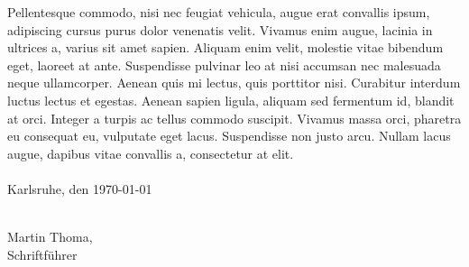 \documentclass[11pt,a4paper,oneside]{scrartcl}
\newcommand\Schriftfuehrer{Martin Thoma}
\newcommand\Ort{Karlsruhe}
\newcommand\Datum{\today}   %
\begin{document}
Pellentesque commodo, nisi nec feugiat vehicula, augue erat convallis ipsum, adipiscing cursus purus dolor venenatis velit. Vivamus enim augue, lacinia in ultrices a, varius sit amet sapien. Aliquam enim velit, molestie vitae bibendum eget, laoreet at ante. Suspendisse pulvinar leo at nisi accumsan nec malesuada neque ullamcorper. Aenean quis mi lectus, quis porttitor nisi. Curabitur interdum luctus lectus et egestas. Aenean sapien ligula, aliquam sed fermentum id, blandit at orci. Integer a turpis ac tellus commodo suscipit. Vivamus massa orci, pharetra eu consequat eu, vulputate eget lacus. Suspendisse non justo arcu. Nullam lacus augue, dapibus vitae convallis a, consectetur at elit.
\\\nopagebreak
\\\nopagebreak
\noindent \Ort, den \Datum\\\nopagebreak
\\\nopagebreak
{}

\noindent \Schriftfuehrer,\\\nopagebreak
Schriftführer
\end{document}
